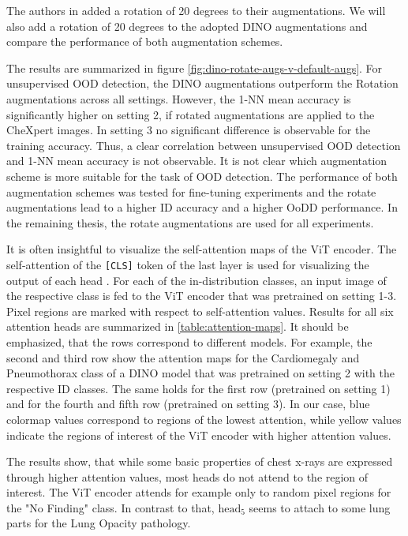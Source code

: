 The authors in \citep{Azizi2021} added a rotation of 20 degrees to their augmentations.
We will also add a rotation of 20 degrees to the adopted DINO augmentations and compare the performance of both augmentation schemes.
\par
The results are summarized in figure \ref{fig:dino-rotate-augs-v-default-augs}.
For unsupervised OOD detection, the DINO augmentations outperform the Rotation augmentations across all settings.
However, the 1-NN mean accuracy is significantly higher on setting 2, if rotated augmentations are applied to the CheXpert images.
In setting 3 no significant difference is observable for the training accuracy.
Thus, a clear correlation between unsupervised OOD detection and 1-NN mean accuracy is not observable.
It is not clear which augmentation scheme is more suitable for the task of OOD detection.
The performance of both augmentation schemes was tested for fine-tuning experiments and the rotate augmentations lead to a higher ID accuracy and a higher OoDD performance. 
In the remaining thesis, the rotate augmentations are used for all experiments.
\par
It is often insightful to visualize the self-attention maps of the ViT encoder.
The self-attention of the \texttt{[CLS]} token of the last layer is used for visualizing the output of each head \citep{Caron2021,Dosovitskiy2020}.
For each of the in-distribution classes, an input image of the respective class is fed to the ViT encoder that was pretrained on setting 1-3.
Pixel regions are marked with respect to self-attention values.
Results for all six attention heads are summarized in \ref{table:attention-maps}.
It should be emphasized, that the rows correspond to different models.
For example, the second and third row show the attention maps for the Cardiomegaly and Pneumothorax class of a DINO model that was pretrained on setting 2 with the respective ID classes.
The same holds for the first row (pretrained on setting 1) and for the fourth and fifth row (pretrained on setting 3).
In our case, blue colormap values correspond to regions of the lowest attention, while yellow values indicate the regions of interest of the ViT encoder with higher attention values.
\par
The results show, that while some basic properties of chest x-rays are expressed through higher attention values, most heads do not attend to the region of interest.
The ViT encoder attends for example only to random pixel regions for the "No Finding" class.
In contrast to that, $\text{head}_5$ seems to attach to some lung parts for the Lung Opacity pathology.
